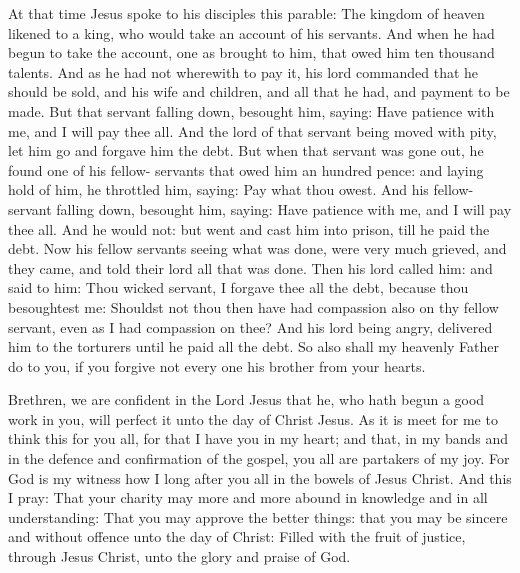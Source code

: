 
At that time Jesus spoke to his disciples this parable:
The kingdom of heaven likened to a king, who would
take an account of his servants.
And when he had begun to take the account, one as brought to him,
that owed him ten thousand talents.
And as he had not wherewith to pay it, his lord commanded that he
should be sold, and his wife and children, and all that he had, and
payment to be made.
But that servant falling down, besought him, saying: Have
patience with me, and I will pay thee all.
And the lord of that servant being moved with pity, let him go
and forgave him the debt.
But when that servant was gone out, he found one of his fellow-
servants that owed him an hundred pence: and laying hold of him, he
throttled him, saying: Pay what thou owest.
And his fellow-servant falling down, besought him, saying: Have
patience with me, and I will pay thee all.
And he would not: but went and cast him into prison, till he paid
the debt.
Now his fellow servants seeing what was done, were very much
grieved, and they came, and told their lord all that was done.
Then his lord called him: and said to him: Thou wicked servant, I
forgave thee all the debt, because thou besoughtest me:
Shouldst not thou then have had compassion also on thy fellow
servant, even as I had compassion on thee?
And his lord being angry, delivered him to the torturers until he
paid all the debt.
So also shall my heavenly Father do to you, if you forgive not
every one his brother from your hearts.


\bigskip




Brethren, we are confident in the Lord Jesus that he, who hath begun a good
work in you, will perfect it unto the day of Christ Jesus.
As it is meet for me to think this for you all, for that I have you
in my heart; and that, in my bands and in the defence and confirmation
of the gospel, you all are partakers of my joy.
For God is my witness how I long after you all in the bowels of
Jesus Christ.
And this I pray: That your charity may more and more abound in
knowledge and in all understanding:
That you may approve the better things: that you may be sincere
and without offence unto the day of Christ:
Filled with the fruit of justice, through Jesus Christ, unto the
glory and praise of God.


